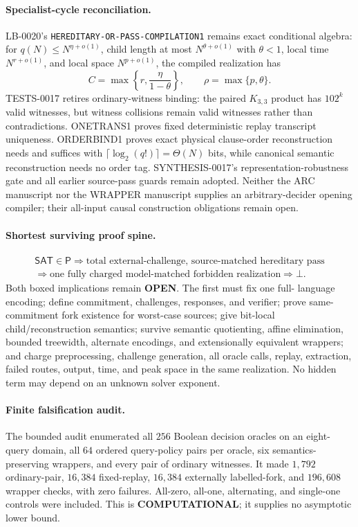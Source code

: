 \documentclass[11pt]{article}
\newcommand{\statusopen}{\textcolor{openstatus}{\textbf{OPEN}}}
\begin{document}
\paragraph{Specialist-cycle reconciliation.}
LB-0020's \texttt{HEREDITARY-OR-PASS-COMPILATION1} remains exact conditional
algebra: for $q(N)\le N^{\eta+o(1)}$, child length at most
$N^{\theta+o(1)}$ with $\theta<1$, local time $N^{r+o(1)}$, and local space
$N^{p+o(1)}$, the compiled realization has
\[
 C=\max\left\{r,\frac{\eta}{1-\theta}\right\},
 \qquad \rho=\max\{p,\theta\}.
\]
TESTS-0017 retires ordinary-witness binding: the paired $K_{3,3}$ product has
$102^k$ valid witnesses, but witness collisions remain valid witnesses rather
than contradictions.  ONETRANS1 proves fixed deterministic replay transcript
uniqueness.  ORDERBIND1 proves exact physical clause-order reconstruction
needs and suffices with $\lceil\log_2(q!)\rceil=\Theta(N)$ bits, while
canonical semantic reconstruction needs no order tag.  SYNTHESIS-0017's
representation-robustness gate and all earlier source-pass guards remain
adopted.  Neither the ARC manuscript  nor the WRAPPER
manuscript  supplies an arbitrary-decider opening compiler;
their all-input causal construction obligations remain open.

\paragraph{Shortest surviving proof spine.}
\[
\begin{gathered}
\mathsf{SAT}\in\mathsf P
\Longrightarrow
\boxed{\text{total external-challenge, source-matched hereditary pass}}\\
\Longrightarrow
\boxed{\text{one fully charged model-matched forbidden realization}}
\Longrightarrow\bot .
\end{gathered}
\]
Both boxed implications remain \statusopen.  The first must fix one full-
language encoding; define commitment, challenges, responses, and verifier;
prove same-commitment fork existence for worst-case sources; give bit-local
child/reconstruction semantics; survive semantic quotienting, affine
elimination, bounded treewidth, alternate encodings, and extensionally
equivalent wrappers; and charge preprocessing, challenge generation, all
oracle calls, replay, extraction, failed routes, output, time, and peak space
in the same realization.  No hidden term may depend on an unknown solver
exponent.

\paragraph{Finite falsification audit.}
The bounded audit enumerated all $256$ Boolean decision oracles on an
eight-query domain, all $64$ ordered query-policy pairs per oracle, six
semantics-preserving wrappers, and every pair of ordinary witnesses.  It made
$1{,}792$ ordinary-pair, $16{,}384$ fixed-replay, $16{,}384$ externally
labelled-fork, and $196{,}608$ wrapper checks, with zero failures.  All-zero,
all-one, alternating, and single-one controls were included.  This is
\textbf{COMPUTATIONAL}; it supplies no asymptotic lower bound.
\end{document}
